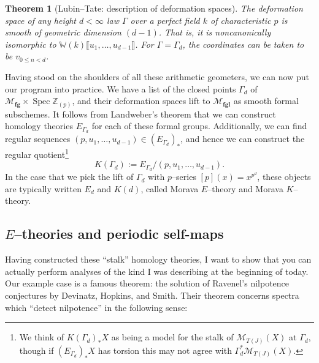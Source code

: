 \documentclass{amsart}
\newcommand{\Z}{\mathbb Z}
\newcommand{\M}{\mathcal{M}}
\newcommand{\<}{\langle}
\renewcommand{\>}{\rangle}
\newcommand{\ps}[1]{\llbracket{#1}\rrbracket}
\newcommand{\moduli}[1]{\mathcal{M}_{\mathbf{#1}}}
\DeclareMathOperator{\Spec}{Spec}
\theoremstyle{plain}
\newtheorem*{theorem}{Theorem}
\theoremstyle{definition}
\theoremstyle{remark}
\begin{document}
\begin{theorem}[Lubin--Tate: description of deformation spaces]
The deformation space of any height $d < \infty$ law $\Gamma$ over a perfect field $k$ of characteristic $p$ is smooth of geometric dimension $(d-1)$.  That is, it is noncanonically isomorphic to $\mathbb W(k)\ps{u_1, \ldots, u_{d-1}}$.  For $\Gamma = \Gamma_d$, the coordinates can be taken to be $v_{0 \le n < d}$.
\end{theorem}



Having stood on the shoulders of all these arithmetic geometers, we can now put our program into practice.  We have a list of the closed points $\Gamma_d$ of $\moduli{fg} \times \Spec \Z_{(p)}$, and their deformation spaces lift to $\moduli{fgl}$ as smooth formal subschemes.  It follows from Landweber's theorem that we can construct homology theories $E_{\Gamma_d}$ for each of these formal groups.  Additionally, we can find regular sequences $(p, u_1, \ldots, u_{d-1}) \in (E_{\Gamma_d})_*$, and hence we can construct the regular quotient\footnote{We think of $K(\Gamma_d)_* X$ as being a model for the stalk of $\M_{T(J)}(X)$ at $\Gamma_d$, though if $(E_{\Gamma_d})_* X$ has torsion this may not agree with $\Gamma_d^* \M_{T(J)}(X)$.} \[K(\Gamma_d) := E_{\Gamma_d} / (p, u_1, \ldots, u_{d-1}).\]  In the case that we pick the lift of $\Gamma_d$ with $p$--series $[p](x) = x^{p^d}$, these objects are typically written $E_d$ and $K(d)$, called Morava $E$--theory and Morava $K$--theory.




\subsection{$E$--theories and periodic self-maps}

Having constructed these ``stalk'' homology theories, I want to show that you can actually perform analyses of the kind I was describing at the beginning of today.  Our example case is a famous theorem: the solution of Ravenel's nilpotence conjectures by Devinatz, Hopkins, and Smith.  Their theorem concerns spectra which ``detect nilpotence'' in the following sense:
\end{document}
